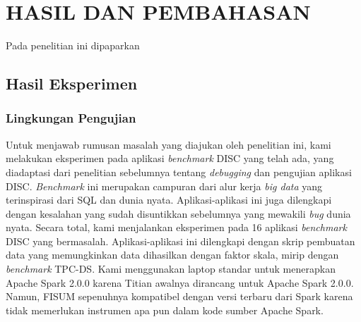 \chapter{HASIL DAN PEMBAHASAN}
\label{chap:hasildanpembahasan}

Pada penelitian ini dipaparkan \lipsum[1][1-5]

\section{Hasil Eksperimen}
\label{sec:hasilpengujian}

\subsection{Lingkungan Pengujian}
\label{subsec:lingkunganpengujian}

Untuk menjawab rumusan masalah yang diajukan oleh penelitian ini,
kami melakukan eksperimen pada aplikasi \emph{benchmark}
DISC yang telah ada, yang diadaptasi dari penelitian sebelumnya
tentang \emph{debugging} dan pengujian aplikasi DISC. \emph{Benchmark}
ini merupakan campuran dari alur kerja \emph{big data} yang
terinspirasi dari SQL dan dunia nyata. Aplikasi-aplikasi
ini juga dilengkapi dengan kesalahan yang sudah disuntikkan
sebelumnya yang mewakili \emph{bug} dunia nyata. Secara total,
kami menjalankan eksperimen pada 16 aplikasi \emph{benchmark}
DISC yang bermasalah. Aplikasi-aplikasi ini dilengkapi
dengan skrip pembuatan data yang memungkinkan data
dihasilkan dengan faktor skala, mirip dengan
\emph{benchmark} TPC-DS. Kami menggunakan laptop standar
untuk menerapkan Apache Spark 2.0.0 karena Titian
awalnya dirancang untuk Apache Spark 2.0.0. Namun,
FISUM sepenuhnya kompatibel dengan versi terbaru dari
Spark karena tidak memerlukan instrumen apa pun dalam
kode sumber Apache Spark. 

